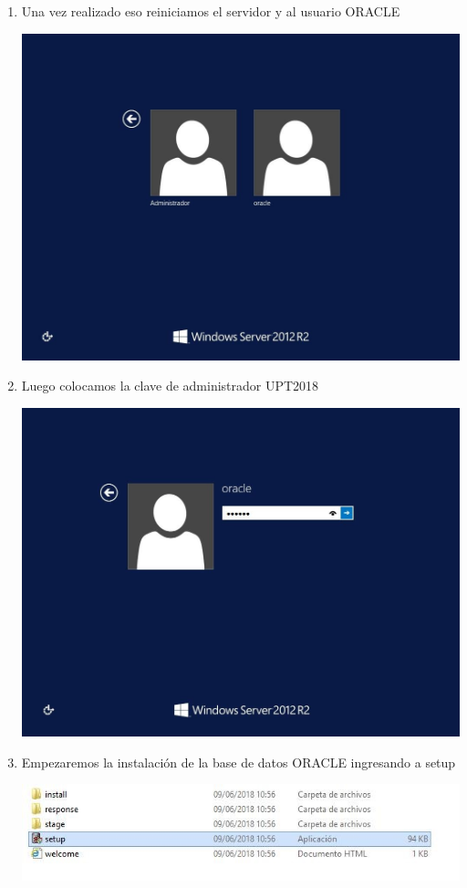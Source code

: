 \begin{enumerate}[1.]
	\item Una vez realizado eso reiniciamos el servidor y al usuario ORACLE \\
	\begin{center}
	\includegraphics[width=15cm]{./Imagenes/img7} 
	\end{center}

	\item Luego colocamos la clave de administrador UPT2018\\
	\begin{center}
	\includegraphics[width=15cm]{./Imagenes/img8} 
	\end{center}

	\item Empezaremos la instalaci\'on de la base de datos ORACLE ingresando a setup\\
	\begin{center}
	\includegraphics[width=15cm]{./Imagenes/img9} 
	\end{center}


\end{enumerate}
